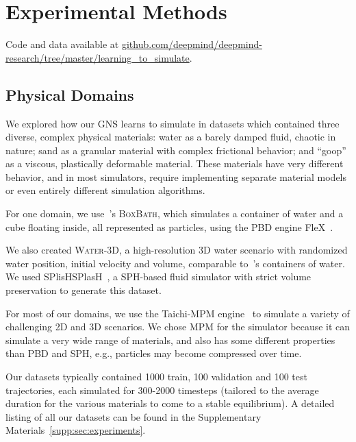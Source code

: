 \documentclass{article}
\newcommand\domain[1]{\textsc{#1}}
\begin{document}
%
\section{Experimental Methods}
\label{sec:experiments}

Code and data available at \href{https://github.com/deepmind/deepmind-research/tree/master/learning_to_simulate}{github.com/deepmind/deepmind-research/tree/master/learning\_to\_simulate}.

\subsection{Physical Domains}
\label{sec:experiment:domains}

%

We explored how our GNS learns to simulate in datasets which contained three diverse, complex physical materials: water as a barely damped fluid, chaotic in nature; sand as a granular material with complex frictional behavior; and ``goop'' as a viscous, plastically deformable material. 
%
These materials have very different behavior, and in most simulators, require implementing separate material models or even entirely different simulation algorithms.

For one domain, we use~\citet{li2018learning}'s \domain{BoxBath}, which simulates a container of water and a cube floating inside, all represented as particles, using the PBD engine FleX~\cite{macklin2014unified}. 

We also created \domain{Water-3D}, a high-resolution 3D water scenario with randomized water position, initial velocity and volume, comparable to~\citet{ummenhofer2020lagrangian}'s containers of water. We used SPlisHSPlasH~\cite{bender2015dfsph}, a SPH-based fluid simulator with strict volume preservation to generate this dataset.

%
%
%
%
%
For most of our domains, we use the Taichi-MPM engine~\cite{hu2018mpm} to simulate a variety of challenging 2D and 3D scenarios. We chose MPM for the simulator because it can simulate a very wide range of materials, and also has some different properties than PBD and SPH, e.g., particles may become compressed over time.

Our datasets typically contained 1000 train, 100 validation and 100 test trajectories, each simulated for 300-2000 timesteps (tailored to the average duration for the various materials to come to a stable equilibrium). A detailed listing of all our datasets can be found in the Supplementary Materials~\ref{supp:sec:experiments}.
\end{document}
